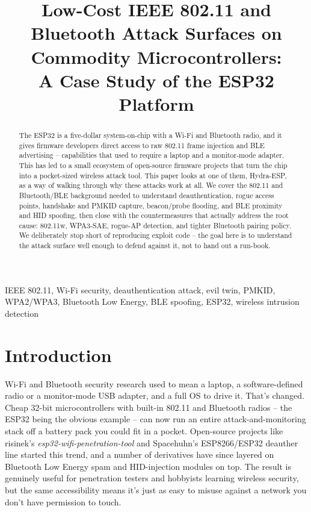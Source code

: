\documentclass[conference]{IEEEtran}
\begin{document}
\title{Low-Cost IEEE 802.11 and Bluetooth Attack Surfaces on Commodity Microcontrollers:\\
A Case Study of the ESP32 Platform}

\author{
}

\maketitle

\begin{abstract}
The ESP32 is a five-dollar system-on-chip with a Wi-Fi and Bluetooth radio, and it gives firmware developers direct access to raw 802.11 frame injection and BLE advertising -- capabilities that used to require a laptop and a monitor-mode adapter. This has led to a small ecosystem of open-source firmware projects that turn the chip into a pocket-sized wireless attack tool. This paper looks at one of them, Hydra-ESP, as a way of walking through why these attacks work at all. We cover the 802.11 and Bluetooth/BLE background needed to understand deauthentication, rogue access points, handshake and PMKID capture, beacon/probe flooding, and BLE proximity and HID spoofing, then close with the countermeasures that actually address the root cause: 802.11w, WPA3-SAE, rogue-AP detection, and tighter Bluetooth pairing policy. We deliberately stop short of reproducing exploit code -- the goal here is to understand the attack surface well enough to defend against it, not to hand out a run-book.
\end{abstract}

\begin{IEEEkeywords}
IEEE 802.11, Wi-Fi security, deauthentication attack, evil twin, PMKID, WPA2/WPA3, Bluetooth Low Energy, BLE spoofing, ESP32, wireless intrusion detection
\end{IEEEkeywords}

\section{Introduction}

Wi-Fi and Bluetooth security research used to mean a laptop, a software-defined radio or a monitor-mode USB adapter, and a full OS to drive it. That's changed. Cheap 32-bit microcontrollers with built-in 802.11 and Bluetooth radios -- the ESP32 being the obvious example -- can now run an entire attack-and-monitoring stack off a battery pack you could fit in a pocket. Open-source projects like risinek's \emph{esp32-wifi-penetration-tool} \cite{risinek} and Spacehuhn's ESP8266/ESP32 deauther line \cite{spacehuhn} started this trend, and a number of derivatives have since layered on Bluetooth Low Energy spam and HID-injection modules on top. The result is genuinely useful for penetration testers and hobbyists learning wireless security, but the same accessibility means it's just as easy to misuse against a network you don't have permission to touch.
\end{document}
